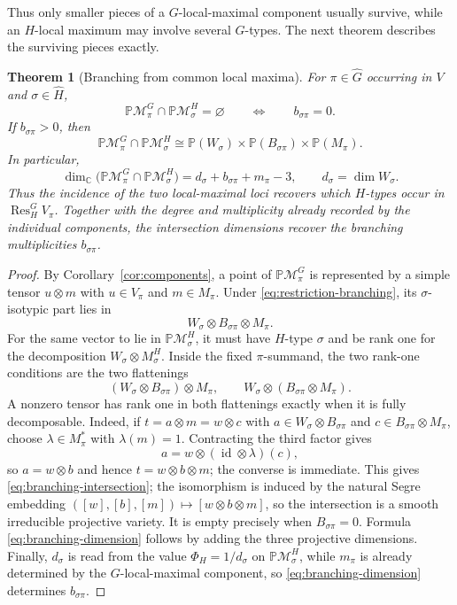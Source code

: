 \documentclass{amsart}
\newtheorem{theorem}{Theorem}
\theoremstyle{remark}
\newcommand{\C}{\mathbb C}
\begin{document}
Thus only smaller pieces of a $G$-local-maximal component usually survive, while an $H$-local
maximum may involve several $G$-types. The next theorem describes the surviving pieces exactly.
 
\begin{theorem}[Branching from common local maxima]\label{thm:branching}
For $\pi\in\widehat G$ occurring in $V$ and $\sigma\in\widehat H$,
\[
 \mathbb P\mathcal M_\pi^G\cap\mathbb P\mathcal M_\sigma^H=\varnothing
 \qquad\Longleftrightarrow\qquad
 b_{\sigma\pi}=0.
\]
If $b_{\sigma\pi}>0$, then
\begin{equation}\label{eq:branching-intersection}
 \mathbb P\mathcal M_\pi^G\cap\mathbb P\mathcal M_\sigma^H
 \cong
 \mathbb P(W_\sigma)\times
 \mathbb P(B_{\sigma\pi})\times
 \mathbb P(M_\pi).
\end{equation}
In particular,
\begin{equation}\label{eq:branching-dimension}
 \dim_{\C}\bigl(\mathbb P\mathcal M_\pi^G\cap\mathbb P\mathcal M_\sigma^H\bigr)
 =d_\sigma+b_{\sigma\pi}+m_\pi-3,
 \qquad d_\sigma=\dim W_\sigma.
\end{equation}
Thus the incidence of the two local-maximal loci recovers which $H$-types occur in
$\operatorname{Res}_H^G V_\pi$. Together with the degree and multiplicity already recorded by the
individual components, the intersection dimensions recover the branching multiplicities
$b_{\sigma\pi}$.
\end{theorem}
 
\begin{proof}
By Corollary~\ref{cor:components}, a point of $\mathbb P\mathcal M_\pi^G$ is represented by a simple
tensor $u\otimes m$ with $u\in V_\pi$ and $m\in M_\pi$. Under \eqref{eq:restriction-branching}, its
$\sigma$-isotypic part lies in
\[
 W_\sigma\otimes B_{\sigma\pi}\otimes M_\pi.
\]
For the same vector to lie in $\mathbb P\mathcal M_\sigma^H$, it must have $H$-type $\sigma$ and be
rank one for the decomposition $W_\sigma\otimes M_\sigma^H$. Inside the fixed $\pi$-summand, the two
rank-one conditions are the two flattenings
\[
 (W_\sigma\otimes B_{\sigma\pi})\otimes M_\pi,
 \qquad
 W_\sigma\otimes(B_{\sigma\pi}\otimes M_\pi).
\]
A nonzero tensor has rank one in both flattenings exactly when it is fully decomposable. Indeed, if
$t=a\otimes m=w\otimes c$ with $a\in W_\sigma\otimes B_{\sigma\pi}$ and
$c\in B_{\sigma\pi}\otimes M_\pi$, choose $\lambda\in M_\pi^*$ with $\lambda(m)=1$. Contracting the
third factor gives
\[
 a=w\otimes (\operatorname{id}\otimes\lambda)(c),
\]
so $a=w\otimes b$ and hence $t=w\otimes b\otimes m$; the converse is immediate. This gives
\eqref{eq:branching-intersection}; the isomorphism is induced by the natural Segre embedding
$([w],[b],[m])\mapsto[w\otimes b\otimes m]$, so the intersection is a smooth irreducible projective
variety. It is empty precisely when
$B_{\sigma\pi}=0$. Formula \eqref{eq:branching-dimension} follows by adding the three projective
dimensions. Finally, $d_\sigma$ is read from the value
$\Phi_H=1/d_\sigma$ on $\mathbb P\mathcal M_\sigma^H$, while $m_\pi$ is already determined by the
$G$-local-maximal component, so \eqref{eq:branching-dimension} determines $b_{\sigma\pi}$.
\end{proof}
\end{document}
